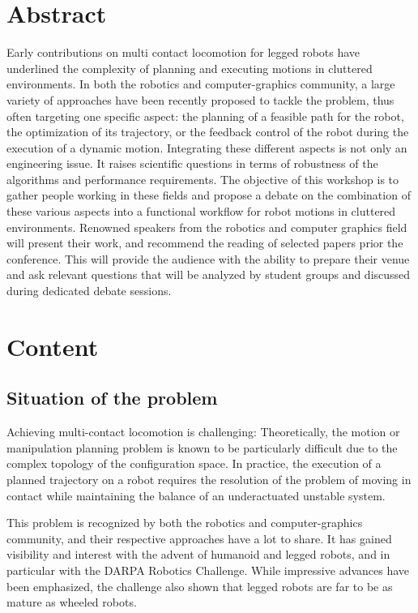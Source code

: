 \documentclass[conference]{IEEEtran}
\begin{document}
\section{\textbf{Abstract}}
Early contributions on multi contact locomotion for legged robots have underlined the complexity of planning and executing motions in cluttered environments. In both the robotics and computer-graphics community, a large variety of approaches have been recently proposed to tackle the problem, thus often targeting one specific aspect: the planning of a feasible path for the robot, the optimization of its trajectory, or the feedback control of the robot during
the execution of a dynamic motion. Integrating these different aspects is not only an engineering issue. It raises scientific questions in terms of robustness of the algorithms and performance requirements. The objective of this workshop is to gather people working in these fields and propose a debate on the combination of these various aspects into a functional workflow for robot motions in cluttered environments.
Renowned speakers from the robotics and computer graphics field will present their work, and recommend the reading of selected papers prior the conference.  This will provide the audience with the ability to prepare their venue and ask relevant questions that will be analyzed by student groups and discussed during dedicated debate sessions.


\section{Content}
\subsection{Situation of the problem}
Achieving multi-contact locomotion is challenging: Theoretically, the motion or manipulation planning problem is known to be particularly difficult due to the complex topology of the configuration space. In practice, the execution of a planned trajectory on a robot requires the resolution of the problem of moving in contact while maintaining the balance of an underactuated unstable system. 

This problem is recognized by both the robotics and computer-graphics community, and their respective approaches have a lot to share.
It has gained visibility and interest with the advent of humanoid and legged robots, and in particular with the DARPA Robotics Challenge. While impressive advances have been emphasized, the challenge also shown that legged robots are far to be as mature as wheeled robots.
\end{document}
